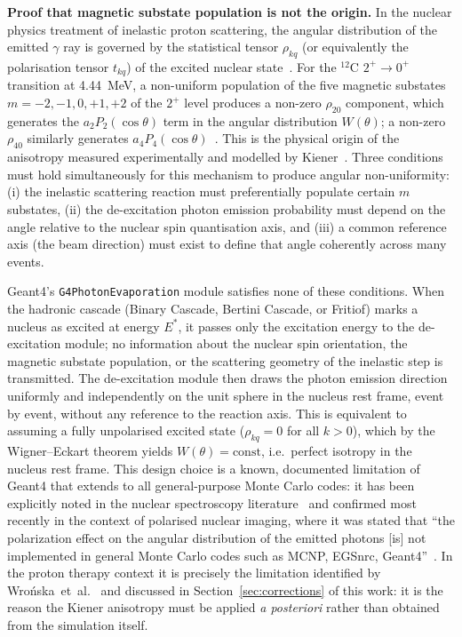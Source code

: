 \documentclass[a4paper]{article}
\begin{document}
\textbf{Proof that magnetic substate population is not the origin.}
In the nuclear physics treatment of inelastic proton scattering, the angular distribution of the emitted $\gamma$ ray is governed by the statistical tensor $\rho_{kq}$ (or equivalently the polarisation tensor $t_{kq}$) of the excited nuclear state~\cite{kiener1998}. For the $^{12}$C $2^+ \to 0^+$ transition at 4.44~MeV, a non-uniform population of the five magnetic substates $m = -2, -1, 0, +1, +2$ of the $2^+$ level produces a non-zero $\rho_{20}$ component, which generates the $a_2 P_2(\cos\theta)$ term in the angular distribution $W(\theta)$; a non-zero $\rho_{40}$ similarly generates $a_4 P_4(\cos\theta)$~\cite{kiener1998,onecha2024}. This is the physical origin of the anisotropy measured experimentally and modelled by Kiener~\cite{kiener1998}. Three conditions must hold simultaneously for this mechanism to produce angular non-uniformity: (i) the inelastic scattering reaction must preferentially populate certain $m$ substates, (ii) the de-excitation photon emission probability must depend on the angle relative to the nuclear spin quantisation axis, and (iii) a common reference axis (the beam direction) must exist to define that angle coherently across many events.

Geant4's \texttt{G4PhotonEvaporation} module satisfies none of these conditions. When the hadronic cascade (Binary Cascade, Bertini Cascade, or Fritiof) marks a nucleus as excited at energy $E^*$, it passes only the excitation energy to the de-excitation module; no information about the nuclear spin orientation, the magnetic substate population, or the scattering geometry of the inelastic step is transmitted. The de-excitation module then draws the photon emission direction uniformly and independently on the unit sphere in the nucleus rest frame, event by event, without any reference to the reaction axis. This is equivalent to assuming a fully unpolarised excited state ($\rho_{kq} = 0$ for all $k > 0$), which by the Wigner--Eckart theorem yields $W(\theta) = \mathrm{const}$, i.e.\ perfect isotropy in the nucleus rest frame. This design choice is a known, documented limitation of Geant4 that extends to all general-purpose Monte Carlo codes: it has been explicitly noted in the nuclear spectroscopy literature~\cite{doublebeta2008} and confirmed most recently in the context of polarised nuclear imaging, where it was stated that ``the polarization effect on the angular distribution of the emitted photons [is] not implemented in general Monte Carlo codes such as MCNP, EGSnrc, Geant4''~\cite{gatepni2025}. In the proton therapy context it is precisely the limitation identified by Wrońska~et~al.~\cite{wronska2021} and discussed in Section~\ref{sec:corrections} of this work: it is the reason the Kiener anisotropy must be applied \emph{a posteriori} rather than obtained from the simulation itself.
\end{document}

